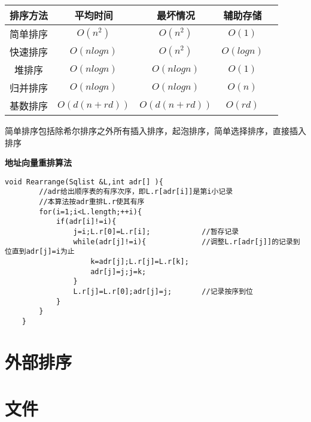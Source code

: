 \documentclass[UTF8]{ctexart}
\newcommand{\mb}[1]{\textbf{#1}}
\begin{document}
\begin{center}
    \begin{tabular}{ccccc}
        \toprule
        排序方法 & 平均时间 & 最坏情况 & 辅助存储   \\
        \midrule
        简单排序 & $O(n^2)$     &  $O(n^2)$ & $O(1)$  \\
        快速排序 & $O(nlogn)$   & $O(n^2)$  & $O(logn)$  \\
        堆排序   & $O(nlogn)$   & $O(nlogn)$  & $O(1)$  \\
        归并排序 & $O(nlogn)$   & $O(nlogn)$  & $O(n)$  \\
        基数排序 & $O(d(n+rd))$ & $O(d(n+rd))$  & $O(rd)$  \\
        \bottomrule
    \end{tabular}%
\end{center}


 

简单排序包括除希尔排序之外所有插入排序，起泡排序，简单选择排序，直接插入排序

\mb{地址向量重排算法}

\begin{lstlisting}[style=v1]
    void Rearrange(Sqlist &L,int adr[] ){
        //adr给出顺序表的有序次序，即L.r[adr[i]]是第i小记录
        //本算法按adr重排L.r使其有序
        for(i=1;i<L.length;++i){
            if(adr[i]!=i){
                j=i;L.r[0]=L.r[i];            //暂存记录  
                while(adr[j]!=i){             //调整L.r[adr[j]]的记录到位直到adr[j]=i为止  
                    k=adr[j];L.r[j]=L.r[k];     
                    adr[j]=j;j=k;
                }
                L.r[j]=L.r[0];adr[j]=j;       //记录按序到位 
            }
        }
    }
\end{lstlisting}


\newpage
\section{外部排序}
\newpage
\section{文件}










 
\end{document}
